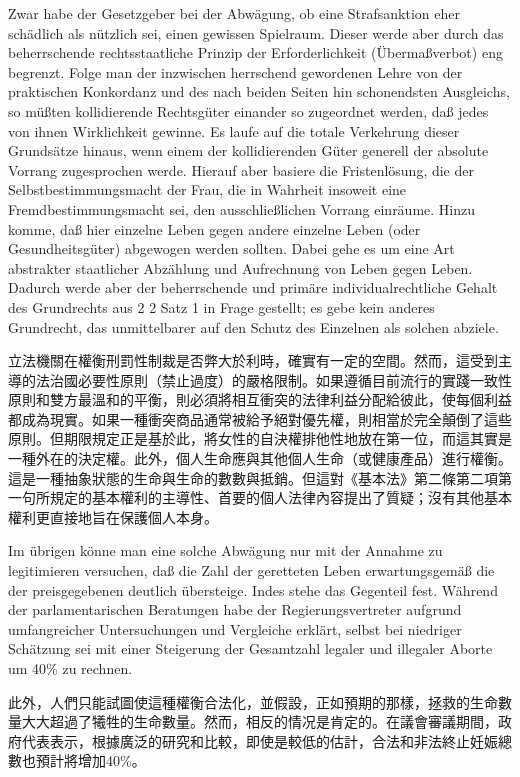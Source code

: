 \documentclass[12pt]{article}
\begin{document}
\syncleft
\begin{sourcepara}
Zwar habe der Gesetzgeber bei der Abwägung, ob eine Strafsanktion eher schädlich als nützlich sei, einen gewissen Spielraum. Dieser werde aber durch das beherrschende rechtsstaatliche Prinzip der Erforderlichkeit (Übermaßverbot) eng begrenzt. Folge man der inzwischen herrschend gewordenen Lehre von der praktischen Konkordanz und des nach beiden Seiten hin schonendsten Ausgleichs, so müßten kollidierende Rechtsgüter einander so zugeordnet werden, daß jedes von ihnen Wirklichkeit gewinne. Es laufe auf die totale Verkehrung dieser Grundsätze hinaus, wenn einem der kollidierenden Güter generell der absolute Vorrang zugesprochen werde. Hierauf aber basiere die Fristenlösung, die der Selbstbestimmungsmacht der Frau, die in Wahrheit insoweit eine Fremdbestimmungsmacht sei, den ausschließlichen Vorrang einräume. Hinzu komme, daß hier einzelne Leben gegen andere einzelne Leben (oder Gesundheitsgüter) abgewogen werden sollten. Dabei gehe es um eine Art abstrakter staatlicher Abzählung und Aufrechnung von Leben gegen Leben. Dadurch werde aber der beherrschende und primäre individualrechtliche Gehalt des Grundrechts aus \abbrArt{} 2 \abbrAbs{} 2 Satz 1 \abbrGG{}\ggfnArtTwoTwoOneDE{} in Frage gestellt; es gebe kein anderes Grundrecht, das unmittelbarer auf den Schutz des Einzelnen als solchen abziele.
\end{sourcepara}
\begin{transpara}
立法機關在權衡刑罰性制裁是否弊大於利時，確實有一定的空間。然而，這受到主導的法治國必要性原則（禁止過度）的嚴格限制。如果遵循目前流行的實踐一致性原則和雙方最溫和的平衡，則必須將相互衝突的法律利益分配給彼此，使每個利益都成為現實。如果一種衝突商品通常被給予絕對優先權，則相當於完全顛倒了這些原則。但期限規定正是基於此，將女性的自決權排他性地放在第一位，而這其實是一種外在的決定權。此外，個人生命應與其他個人生命（或健康產品）進行權衡。這是一種抽象狀態的生命與生命的數數與抵銷。但這對《基本法》第二條第二項第一句\ggfnArtTwoTwoOneZH{}所規定的基本權利的主導性、首要的個人法律內容提出了質疑；沒有其他基本權利更直接地旨在保護個人本身。
\end{transpara}

\syncleft
\begin{sourcepara}
Im übrigen könne man eine solche Abwägung nur mit der Annahme zu legitimieren versuchen, daß die Zahl der geretteten Leben erwartungsgemäß die der preisgegebenen deutlich übersteige. Indes stehe das Gegenteil fest. Während der parlamentarischen Beratungen habe der Regierungsvertreter aufgrund umfangreicher Untersuchungen und Vergleiche erklärt, selbst bei niedriger Schätzung sei mit einer Steigerung der Gesamtzahl legaler und illegaler Aborte um 40\% zu rechnen.
\end{sourcepara}
\begin{transpara}
此外，人們只能試圖使這種權衡合法化，並假設，正如預期的那樣，拯救的生命數量大大超過了犧牲的生命數量。然而，相反的情况是肯定的。在議會審議期間，政府代表表示，根據廣泛的研究和比較，即使是較低的估計，合法和非法終止妊娠總數也預計將增加40\%。
\end{transpara}
\end{document}
